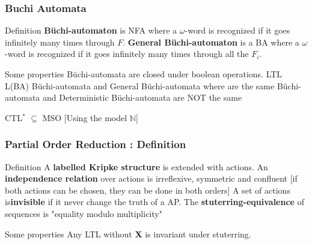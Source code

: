 \documentclass[pdf]{beamer}
\newcommand{\N}{\ensuremath{\mathbb{N}}}
\begin{document}
\begin{frame}
\frametitle{Buchi Automata}

\begin{block}{Definition}
\textbf{Büchi-automaton} is NFA where a $\omega$-word is recognized if it goes infinitely many times through $F$.\newline
\textbf{General Büchi-automaton} is a BA where a $\omega$-word is recognized if it goes infinitely many times through all the $F_i$.\newline
\end{block}




\begin{alertblock}{Some properties}
Büchi-automata are closed under boolean operations. \newline
LTL \subseteq L(BA) \newline
Büchi-automata and General Büchi-automata where are the same \newline	
Büchi-automata and Deterministic Büchi-automata are NOT the same \newline	

CTL$^*$ $\subseteq$ MSO [Using the model $\N$]\newline
\end{alertblock}

\end{frame}

\begin{frame}
\frametitle{Partial Order Reduction : Definition}

\begin{block}{Definition}
A \textbf{labelled Kripke structure} is extended with actions.\newline
An \textbf{independence relation} over actions is irreflexive, symmetric and confluent [if both actions can be chosen, they can be done in both orders]\newline
A set of actions is\textbf{invisible} if it never change the truth of a AP.\newline
The \textbf{stuterring-equivalence} of sequences is "equality modulo multiplicity"
\end{block}


\begin{alertblock}{Some properties}
Any LTL without \textbf{X} is invariant under stuterring.
\end{alertblock}
\end{frame}
\end{document}
